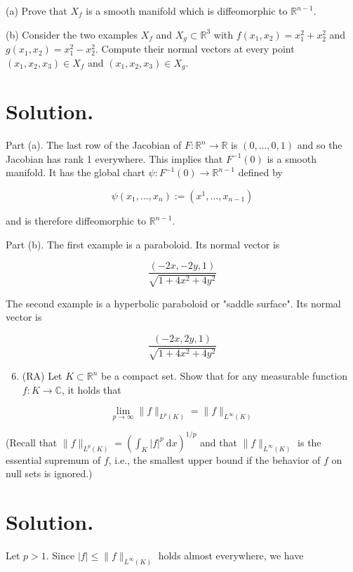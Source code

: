 \documentclass[10pt]{article}
\begin{document}
(a) Prove that $X_{f}$ is a smooth manifold which is diffeomorphic to $\mathbb{R}^{n-1}$.

(b) Consider the two examples $X_{f}$ and $X_{g} \subset \mathbb{R}^{3}$ with $f\left(x_{1}, x_{2}\right)=x_{1}^{2}+x_{2}^{2}$ and $g\left(x_{1}, x_{2}\right)=x_{1}^{2}-x_{2}^{2}$. Compute their normal vectors at every point $\left(x_{1}, x_{2}, x_{3}\right) \in X_{f}$ and $\left(x_{1}, x_{2}, x_{3}\right) \in X_{g}$.

\section{Solution.}
Part (a). The last row of the Jacobian of $F: \mathbb{R}^{n} \rightarrow \mathbb{R}$ is $(0, \ldots, 0,1)$ and so the Jacobian has rank 1 everywhere. This implies that $F^{-1}(0)$ is a smooth manifold. It has the global chart $\psi: F^{-1}(0) \rightarrow \mathbb{R}^{n-1}$ defined by

$$
\psi\left(x_{1}, \ldots, x_{n}\right):=\left(x^{1}, \ldots, x_{n-1}\right)
$$

and is therefore diffeomorphic to $\mathbb{R}^{n-1}$.

Part (b). The first example is a paraboloid. Its normal vector is

$$
\frac{(-2 x,-2 y, 1)}{\sqrt{1+4 x^{2}+4 y^{2}}}
$$

The second example is a hyperbolic paraboloid or "saddle surface". Its normal vector is

$$
\frac{(-2 x, 2 y, 1)}{\sqrt{1+4 x^{2}+4 y^{2}}}
$$

\begin{enumerate}
  \setcounter{enumi}{5}
  \item (RA) Let $K \subset \mathbb{R}^{n}$ be a compact set. Show that for any measurable function $f: K \rightarrow \mathbb{C}$, it holds that
\end{enumerate}

$$
\lim _{p \rightarrow \infty}\|f\|_{L^{p}(K)}=\|f\|_{L^{\infty}(K)}
$$

(Recall that $\|f\|_{L^{p}(K)}=\left(\int_{K}|f|^{p} \mathrm{~d} x\right)^{1 / p}$ and that $\|f\|_{L^{\infty}(K)}$ is the essential supremum of $f$, i.e., the smallest upper bound if the behavior of $f$ on null sets is ignored.)

\section{Solution.}
Let $p>1$. Since $|f| \leq\|f\|_{L^{\infty}(K)}$ holds almost everywhere, we have
\end{document}
